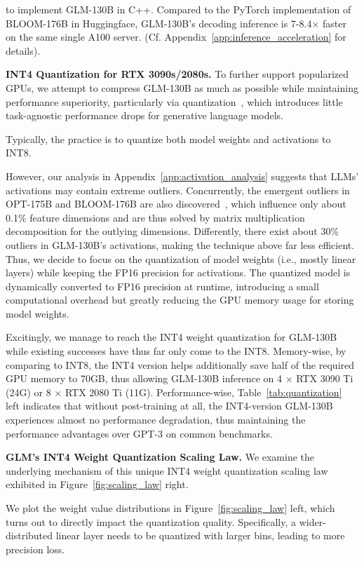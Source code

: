 to implement GLM-130B in C++. Compared to the PyTorch implementation of BLOOM-176B in Huggingface, GLM-130B's decoding inference is 7-8.4$\times$ faster on the same single A100 server. (Cf. Appendix~\ref{app:inference_acceleration} for details).

\textbf{INT4 Quantization for RTX 3090s/2080s.} To further support popularized GPUs, we attempt to compress GLM-130B as much as possible while maintaining performance superiority, particularly via  quantization~\citep{zafrir2019q8bert,shen2020q,tao2022compression}, which introduces little task-agnostic performance drops for generative language models. 

Typically, the practice is to quantize both model weights and activations to INT8.

However, our analysis in Appendix~\ref{app:activation_analysis} suggests that LLMs' activations may contain extreme outliers. Concurrently, the emergent outliers in OPT-175B and BLOOM-176B are also discovered~\citep{dettmers2022llm}, which influence only about 0.1\% feature dimensions and are thus solved by matrix multiplication decomposition for the outlying dimensions. Differently, there exist about 30\% outliers in GLM-130B's activations, making the technique above far less efficient. Thus, we decide to focus on the quantization of model weights (i.e., mostly linear layers) while keeping the FP16 precision for activations. The quantized model is dynamically converted to FP16 precision at runtime, introducing a small computational overhead but greatly reducing the GPU memory usage for storing model weights. 

Excitingly, we manage to reach the INT4 weight quantization for GLM-130B while existing successes have thus far only come to the INT8. Memory-wise, by comparing to INT8, the INT4 version helps additionally save half of the required GPU memory to 70GB, thus allowing GLM-130B inference on 4 $\times$ RTX 3090 Ti (24G) or 8 $\times$ RTX 2080 Ti (11G). Performance-wise, Table~\ref{tab:quantization} left indicates that without post-training at all, the INT4-version GLM-130B experiences almost no performance degradation, thus maintaining the performance advantages over GPT-3 on common benchmarks. 

\textbf{GLM's INT4 Weight Quantization Scaling Law.} We examine the underlying mechanism of this unique INT4 weight quantization scaling law exhibited in Figure~\ref{fig:scaling_law} right. 

We plot the weight value distributions in  Figure~\ref{fig:scaling_law} left, which turns out to directly impact the quantization quality. Specifically, a wider-distributed linear layer needs to be quantized with larger bins, leading to more precision loss.

